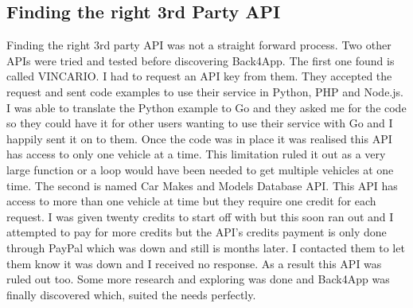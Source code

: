 \subsection{Finding the right 3rd Party API}
Finding the right 3rd party API was not a straight forward process. Two other APIs were tried and tested before discovering Back4App. The first one found is called VINCARIO. I had to request an API key from them. They accepted the request and sent code examples to use their service in Python, PHP and Node.js. I was able to translate the Python example to Go and they asked me for the code so they could have it for other users wanting to use their service with Go and I happily sent it on to them. Once the code was in place it was realised this API has access to only one vehicle at a time. This limitation ruled it out as a very large function or a loop would have been needed to get multiple vehicles at one time. The second is named Car Makes and Models Database API. This API has access to more than one vehicle at time but they require one credit for each request. I was given twenty credits to start off with but this soon ran out and I attempted to pay for more credits but the API's credits payment is only done through PayPal which was down and still is months later. I contacted them to let them know it was down and I received no response. As a result this API was ruled out too. Some more research and exploring was done and Back4App was finally discovered which, suited the needs perfectly. 


